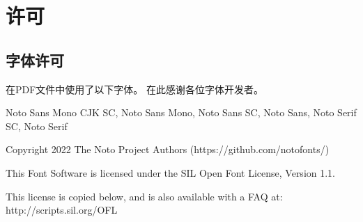 \chapter*{许可}

\section*{字体许可}

在PDF文件中使用了以下字体。
在此感谢各位字体开发者。

\vspace{\baselineskip}

Noto Sans Mono CJK SC, Noto Sans Mono, Noto Sans SC, Noto Sans, Noto Serif SC, Noto Serif

Copyright 2022 The Noto Project Authors (https://github.com/notofonts/)

This Font Software is licensed under the SIL Open Font License,
Version 1.1.

This license is copied below, and is also available with a FAQ at:
http://scripts.sil.org/OFL

